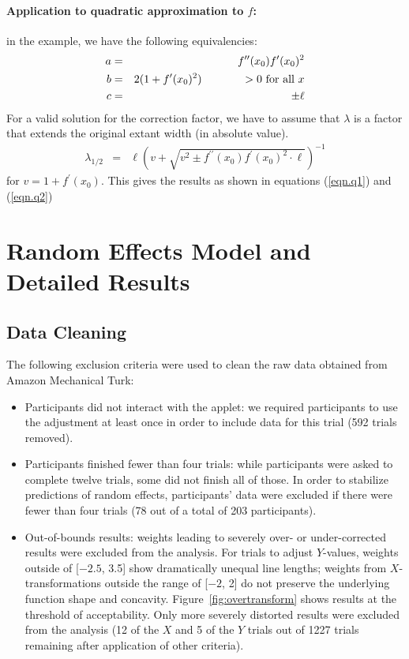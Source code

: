 \documentclass[12pt]{article}\usepackage[]{graphicx}\usepackage[]{color}
\begin{document}
\begin{appendix}
\paragraph{Application to quadratic approximation to $f$:}
in the example, we have the following equivalencies:
\begin{eqnarray*}
a &=& f^{\prime\prime}(x_0) f^\prime(x_0)^2 \\
b &=& 2(1 + f^\prime(x_0)^2) \hspace{.5in} > 0 \text{ for all } x \\
c &=& \pm \ell 
\end{eqnarray*}
For a valid solution for the correction factor, we have to assume that $\lambda$ is a factor that extends the original extant width (in absolute value). 
\begin{eqnarray*}
\lambda_{1/2} &=& \ell \left(v + \sqrt{ v^2 \pm  f^{\prime\prime}(x_0) f^\prime(x_0)^2\cdot \ell}\right)^{-1} 
\end{eqnarray*}
for $v = 1 + f^\prime(x_0)$. 
This gives the results as shown in equations (\ref{eqn.q1}) and (\ref{eqn.q2})


\section{Random Effects Model and Detailed Results}\label{model}
\subsection{Data Cleaning}\label{exclusion}
The following exclusion criteria were used to clean the raw data obtained from Amazon Mechanical Turk:
\begin{itemize}
\item Participants did not interact with the applet: we required participants to use the adjustment at least once in order to include data for this trial (592 trials removed).
\item Participants finished fewer than four trials: while participants were asked to complete twelve trials, some did not finish all of those. In order to stabilize predictions of random effects, participants' data were excluded if there were fewer than four trials (78 out of a total of 203 participants).
\item Out-of-bounds results: weights leading to severely over- or under-corrected results were excluded from the analysis. 
For trials to adjust $Y$-values, weights outside of [\ensuremath{-2.5}, 3.5]  show dramatically unequal line lengths; weights from $X$-transformations outside the range of [\ensuremath{-2}, 2] do not preserve the underlying function shape and concavity. 
Figure~\ref{fig:overtransform} shows results at the threshold of acceptability. Only more severely distorted results were excluded from the analysis (12 of the $X$ and 5 of the $Y$ trials out of 1227 trials remaining after application of other criteria).
\end{itemize}


\end{appendix}
\end{document}
